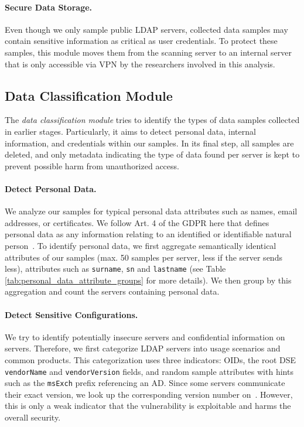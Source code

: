 \paragraph{Secure Data Storage.} Even though we only sample public LDAP servers, collected data samples may contain sensitive information as critical as user credentials. To protect these samples, this module moves them from the scanning server to an internal server that is only accessible via VPN by the researchers involved in this analysis.

\subsection{Data Classification Module}
\label{sec:methodology_data_analysis_module}

The \emph{data classification module} tries to identify the types of data samples collected in earlier stages. Particularly, it aims to detect personal data, internal information, and credentials within our samples. In its final step, all samples are deleted, and only metadata indicating the type of data found per server is kept to prevent possible harm from unauthorized access.

\paragraph{Detect Personal Data.}

We analyze our samples for typical personal data attributes such as names, email addresses, or certificates. We follow Art. 4 of the \acrshort{GDPR} here that defines personal data as any information relating to an identified or identifiable natural person~\cite[Art. 4]{GDPR2016a}. To identify personal data, we first aggregate semantically identical attributes of our samples (max. 50 samples per server, less if the server sends less), \eg attributes such as \texttt{surname}, \texttt{sn} and \texttt{lastname} (see Table \ref{tab:personal_data_attribute_groups} for more details). We then group by this aggregation and count the servers containing personal data.  

\paragraph{Detect Sensitive Configurations.}

We try to identify potentially insecure servers and confidential information on servers. Therefore, we first categorize LDAP servers into usage scenarios and common products. This categorization uses three indicators: OIDs, the root \gls{DSE} \texttt{vendorName} and \texttt{vendorVersion} fields, and random sample attributes with hints such as the \texttt{msExch} prefix referencing an AD. Since some servers communicate their exact version, we look up the corresponding version number on~\cite{security_vulnerability_database}. However, this is only a weak indicator that the vulnerability is exploitable and harms the overall security. 

